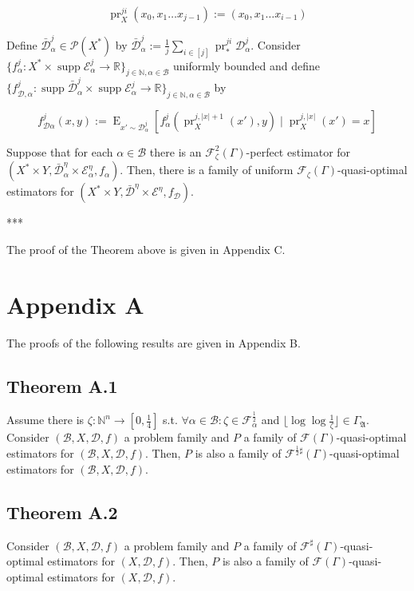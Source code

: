 \documentclass[a4paper]{article}
\DeclareMathOperator{\Supp}{supp}
\DeclareMathOperator{\E}{E}
\DeclareMathOperator{\Prj}{pr}
\newcommand{\Nats}{\mathbb{N}}
\newcommand{\Reals}{\mathbb{R}}
\newcommand{\Abs}[1]{\lvert #1 \rvert}
\newcommand{\Floor}[1]{\lfloor #1 \rfloor}
\newcommand{\Dist}{\mathcal{D}}
\newcommand{\GrowA}{\Gamma_{\mathfrak{A}}}
\newcommand{\Fall}{\mathcal{F}}
\newcommand{\EG}{\Fall(\Gamma)}
\newcommand{\ESG}{\Fall^\sharp(\Gamma)}
\newcommand{\Base}{\mathcal{B}}
\newcommand{\Prob}{\mathcal{P}}
\begin{document}
$${\Prj_X^{ji}(x_0, x_1 \ldots x_{j-1}):=(x_0, x_1 \ldots x_{i-1})}$$

Define ${\bar{\Dist}_\alpha^j \in \Prob(X^*)}$ by ${\bar{\Dist}_\alpha^j:=\frac{1}{j}\sum_{i \in [j]} \Prj^{ji}_* \Dist_\alpha^j}$. Consider ${\{f_\alpha^j: X^* \times \Supp \mathcal{E}_\alpha^j \rightarrow \Reals\}_{j \in \Nats, \alpha \in \Base}}$ uniformly bounded and define ${\{f_{\Dist,\alpha}^j: \Supp \bar{\Dist}_\alpha^j \times \Supp \mathcal{E}_\alpha^j \rightarrow \Reals\}_{j \in \Nats, \alpha \in \Base}}$ by 

$${f_{\Dist\alpha}^j(x,y):=\E_{x' \sim \Dist_\alpha^j}[f_\alpha^j(\Prj_X^{j,\Abs{x}+1}(x'),y) \mid \Prj_X^{j,\Abs{x}}(x')=x]}$$

Suppose that for each ${\alpha \in \Base}$ there is an ${\Fall_\zeta^2(\Gamma)}$-perfect estimator for ${(X^* \times Y, \bar{\Dist}_\alpha^\eta \times \mathcal{E}_\alpha^\eta,f_\alpha)}$. Then, there is a family of uniform ${\Fall_\zeta(\Gamma)}$-quasi-optimal estimators for ${(X^* \times Y, \bar{\Dist}^\eta \times \mathcal{E}^\eta,f_\Dist)}$.

***

The proof of the Theorem above is given in Appendix C.

\section{Appendix A}

The proofs of the following results are given in Appendix B.

\subsection{Theorem A.1}

Assume there is ${\zeta: \Nats^n \rightarrow [0,\frac{1}{4}]}$ s.t. ${\forall \alpha \in \Base: \zeta \in \Fall_\alpha^{\frac{1}{2}}}$ and ${\Floor{\log \log \frac{1}{\zeta}}} \in \GrowA$. Consider ${(\Base,X,\Dist,f)}$ a problem family and $P$ a family of ${\EG}$-quasi-optimal estimators for ${(\Base,X,\Dist,f)}$. Then, ${P}$ is also a family of ${\Fall^{\frac{1}{2}\sharp}(\Gamma)}$-quasi-optimal estimators for ${(\Base,X,\Dist,f)}$.

\subsection{Theorem A.2}

Consider ${(\Base,X,\Dist,f)}$ a problem family and $P$ a family of ${\ESG}$-quasi-optimal estimators for ${(X,\Dist,f)}$. Then, ${P}$ is also a family of ${\EG}$-quasi-optimal estimators for ${(X,\Dist,f)}$.
\end{document}

